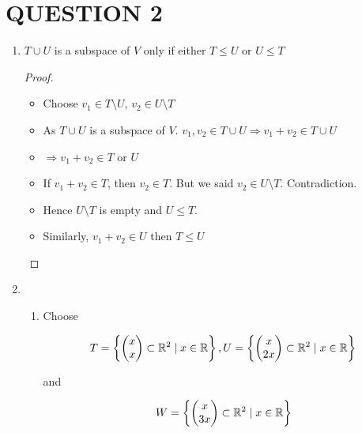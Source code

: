\documentclass[a4paper]{article}
\begin{document}
	
	\section{QUESTION 2}
	
	\begin{enumerate}
	\item \begin{prop} 
		$ T \cup U $ is a subspace of $ V $ only if either $ T \leq U $ or $ U \leq T $
		
	\end{prop}

	\begin{proof}
			\begin{itemize}
			\item Choose $ v_{1} \in T \setminus U $, $ v_{2} \in U \setminus T  $
			\item As $ T \cup U $ is a subspace of $ V $.  $ v_{1},v_{2} \in T \cup U \Rightarrow v_{1} + v_{2} \in T \cup U $
			\item $ \Rightarrow v_{1} + v_{2} \in T$ or $ U $ 
			\item If $ v_{1} + v_{2} \in T $, then $ v_{2} \in T $. But we said $ v_{2} \in U \setminus T $. Contradiction.
			\item Hence $ U \setminus T $ is empty and $ U \leq T $. 
			\item Similarly, $ v_{1} + v_{2} \in U $ then $ T \leq U $
		\end{itemize} 
	\end{proof}

	\item 
	\begin{enumerate}[label = (\alph*)]
		\item Choose 
		
		\[ T = \left\{  \begin{pmatrix}
		x\\
		x\\
		\end{pmatrix} \subset \mathbb{R}^{2} \; | \; x \in \mathbb{R} \right\}, U = \left\{  \begin{pmatrix}
		x\\
		2x\\
		\end{pmatrix} \subset \mathbb{R}^{2} \; | \; x \in \mathbb{R} \right\} \]
		
		and 
		
		\[ W = \left\{  \begin{pmatrix}
		x\\
		3x\\
		\end{pmatrix} \subset \mathbb{R}^{2} \; | \; x \in \mathbb{R} \right\} \]
		

\end{enumerate}
\end{enumerate}
\end{document}
